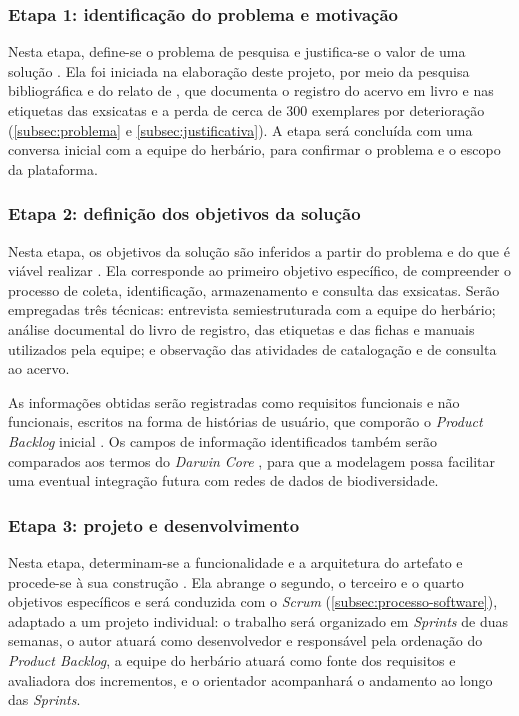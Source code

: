 \documentclass[
    12pt,        %
    openany,     %
    oneside,     %
    a4paper,     %
    english,     %
    french,      %
    spanish,     %
    brazil,      %
    article      %
]{abntex2}
\begin{document}
\subsubsection{Etapa 1: identificação do problema e motivação}
\label{subsubsec:etapa1}

Nesta etapa, define-se o problema de pesquisa e justifica-se o valor de uma solução \cite{peffers2007dsrm}. Ela foi iniciada na elaboração deste projeto, por meio da pesquisa bibliográfica e do relato de , que documenta o registro do acervo em livro e nas etiquetas das exsicatas e a perda de cerca de 300 exemplares por deterioração (\autoref{subsec:problema} e \autoref{subsec:justificativa}). A etapa será concluída com uma conversa inicial com a equipe do herbário, para confirmar o problema e o escopo da plataforma.

\subsubsection{Etapa 2: definição dos objetivos da solução}
\label{subsubsec:etapa2}

Nesta etapa, os objetivos da solução são inferidos a partir do problema e do que é viável realizar \cite{peffers2007dsrm}. Ela corresponde ao primeiro objetivo específico, de compreender o processo de coleta, identificação, armazenamento e consulta das exsicatas. Serão empregadas três técnicas: entrevista semiestruturada com a equipe do herbário; análise documental do livro de registro, das etiquetas e das fichas e manuais utilizados pela equipe; e observação das atividades de catalogação e de consulta ao acervo.

As informações obtidas serão registradas como requisitos funcionais e não funcionais, escritos na forma de histórias de usuário, que comporão o \textit{Product Backlog} inicial \cite{schwaber2020scrum}. Os campos de informação identificados também serão comparados aos termos do \textit{Darwin Core} \cite{tdwg2009darwincore}, para que a modelagem possa facilitar uma eventual integração futura com redes de dados de biodiversidade.

\subsubsection{Etapa 3: projeto e desenvolvimento}
\label{subsubsec:etapa3}

Nesta etapa, determinam-se a funcionalidade e a arquitetura do artefato e procede-se à sua construção \cite{peffers2007dsrm}. Ela abrange o segundo, o terceiro e o quarto objetivos específicos e será conduzida com o \textit{Scrum} (\autoref{subsec:processo-software}), adaptado a um projeto individual: o trabalho será organizado em \textit{Sprints} de duas semanas, o autor atuará como desenvolvedor e responsável pela ordenação do \textit{Product Backlog}, a equipe do herbário atuará como fonte dos requisitos e avaliadora dos incrementos, e o orientador acompanhará o andamento ao longo das \textit{Sprints}.
\end{document}
